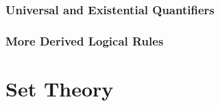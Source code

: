 \documentclass[12pt]{article}
\begin{document}




\subsubsection{Universal and Existential Quantifiers}






\subsubsection{More Derived Logical Rules}


\section{Set Theory} %
\label{sec:sets}




\end{document}
